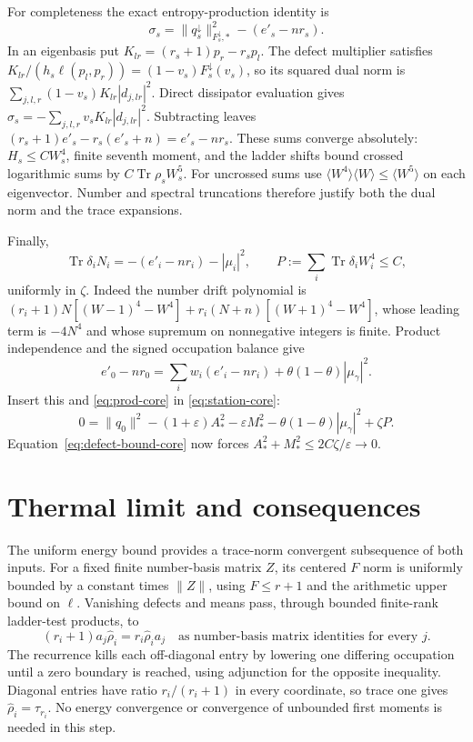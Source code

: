 \documentclass[11pt]{article}
\newcommand{\Tr}{\operatorname{Tr}}
\theoremstyle{remark}\newtheorem{remark}[theorem]{Remark}
\begin{document}
For completeness the exact entropy-production identity is
\begin{equation}\label{eq:prod-core}
 \sigma_s=\|q_s^\downarrow\|_{F_s^\downarrow,*}^2-(e'_s-nr_s).
\end{equation}
In an eigenbasis put $K_{lr}=(r_s+1)p_r-r_sp_l$.
The defect multiplier satisfies
$K_{lr}/(h_s\ell(p_l,p_r))=(1-v_s)F_s^\downarrow(v_s)$,
so its squared dual norm is $\sum_{j,l,r}(1-v_s)K_{lr}|d_{j,lr}|^2$.
Direct dissipator evaluation gives
$\sigma_s=-\sum_{j,l,r}v_s K_{lr}|d_{j,lr}|^2$.
Subtracting leaves $(r_s+1)e'_s-r_s(e'_s+n)=e'_s-nr_s$.
These sums converge absolutely: $H_s\le C W_s^4$, finite seventh moment,
and the ladder shifts bound crossed logarithmic sums by $C\Tr\rho_sW_s^5$.
For uncrossed sums use
$\langle W^4\rangle\langle W\rangle\le\langle W^5\rangle$
on each eigenvector. Number and spectral truncations therefore justify
both the dual norm and the trace expansions.

Finally,
\[
 \Tr\delta_iN_i=-(e'_i-nr_i)-|\mu_i|^2,\qquad
 P:=\sum_i\Tr\delta_iW_i^4\le C,
\]
uniformly in $\zeta$. Indeed the number drift polynomial is
$(r_i+1)N[(W-1)^4-W^4]+r_i(N+n)[(W+1)^4-W^4]$,
whose leading term is $-4N^4$ and whose supremum on nonnegative integers
is finite. Product independence and the signed occupation balance give
\[
 e'_0-nr_0=\sum_iw_i(e'_i-nr_i)+\theta(1-\theta)|\mu_\gamma|^2.
\]
Insert this and \eqref{eq:prod-core} in \eqref{eq:station-core}:
\[
 0=\|q_0\|^2-(1+\varepsilon)A_*^2-\varepsilon M_*^2
 -\theta(1-\theta)|\mu_\gamma|^2+\zeta P.
\]
Equation~\eqref{eq:defect-bound-core} now forces
$A_*^2+M_*^2\le2C\zeta/\varepsilon\to0$.

\section{Thermal limit and consequences}
The uniform energy bound provides a trace-norm convergent subsequence of
both inputs. For a fixed finite number-basis matrix $Z$, its centered
$F$ norm is uniformly bounded by a constant times $\|Z\|$, using
$F\le r+1$ and the arithmetic upper bound on $\ell$.
Vanishing defects and means pass, through bounded finite-rank ladder-test
products, to
\[
 (r_i+1)a_j\widehat\rho_i=r_i\widehat\rho_i a_j
 \quad\text{as number-basis matrix identities for every }j.
\]
The recurrence kills each off-diagonal entry by lowering one differing
occupation until a zero boundary is reached, using adjunction for the
opposite inequality. Diagonal entries have ratio $r_i/(r_i+1)$ in every
coordinate, so trace one gives $\widehat\rho_i=\tau_{r_i}$.
No energy convergence or convergence of unbounded first moments is
needed in this step.
\end{document}
